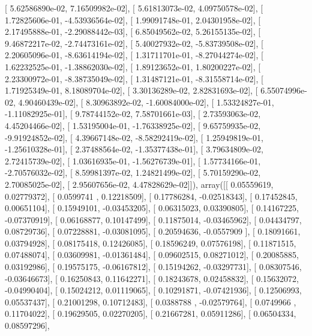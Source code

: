 \documentclass{article}
\begin{document}
       [  5.62586890e-02,   7.16509982e-02],
       [  5.61813073e-02,   4.09750578e-02],
       [  1.72825606e-01,  -4.53936564e-02],
       [  1.99091748e-01,   2.04301958e-02],
       [  2.17495888e-01,  -2.29088442e-03],
       [  6.85049562e-02,   5.26155135e-02],
       [  9.46872217e-02,  -2.74473161e-02],
       [  5.40027932e-02,  -5.83739508e-02],
       [  2.20605096e-01,  -8.63614194e-02],
       [  1.31711701e-01,  -8.27044274e-02],
       [  1.62232525e-01,  -1.38862030e-02],
       [  1.89123652e-01,   1.80200227e-02],
       [  2.23300972e-01,  -8.38735049e-02],
       [  1.31487121e-01,  -8.31558714e-02],
       [  1.71925349e-01,   8.18089704e-02],
       [  3.30136289e-02,   2.82831693e-02],
       [  6.55074996e-02,   4.90460439e-02],
       [  8.30963892e-02,  -1.60084000e-02],
       [  1.53324827e-01,  -1.11082925e-01],
       [  9.78744152e-02,   7.58701661e-03],
       [  2.73593063e-02,   4.45204466e-02],
       [  1.53195004e-01,  -1.76338925e-02],
       [  9.65759935e-02,  -9.91924852e-02],
       [  4.39667148e-02,  -8.58292419e-02],
       [  1.25949819e-01,  -1.25610328e-01],
       [  2.37488564e-02,  -1.35377438e-01],
       [  3.79634809e-02,   2.72415739e-02],
       [  1.03616935e-01,  -1.56276739e-01],
       [  1.57734166e-01,  -2.70576032e-02],
       [  8.59981397e-02,   1.24821499e-02],
       [  5.70159290e-02,   2.70085025e-02],
       [  2.95607656e-02,   4.47828629e-02]]), array([[ 0.05559619,  0.02779372],
       [ 0.0599741 ,  0.12218509],
       [ 0.17786284, -0.02518343],
       [ 0.17452845,  0.00651104],
       [ 0.15949101, -0.03453205],
       [ 0.06315023,  0.03390805],
       [ 0.14167225, -0.07370919],
       [ 0.06168877,  0.10147499],
       [ 0.11875014, -0.03465962],
       [ 0.04434797,  0.08729736],
       [ 0.07228881, -0.03081095],
       [ 0.20594636, -0.0557909 ],
       [ 0.18091661,  0.03794928],
       [ 0.08175418,  0.12426085],
       [ 0.18596249,  0.07576198],
       [ 0.11871515,  0.07488074],
       [ 0.03609981, -0.01361484],
       [ 0.09602515,  0.08271012],
       [ 0.20085885,  0.03192986],
       [ 0.19575175, -0.06167812],
       [ 0.15194262, -0.03297731],
       [ 0.08307546, -0.03646673],
       [ 0.16250843,  0.11642271],
       [ 0.18243678,  0.02458832],
       [ 0.15632072, -0.04990404],
       [ 0.15024212,  0.01119065],
       [ 0.10291871, -0.07421936],
       [ 0.12506993,  0.05537437],
       [ 0.21001298,  0.10712483],
       [ 0.0388788 , -0.02579764],
       [ 0.0749966 ,  0.11704022],
       [ 0.19629505,  0.02270205],
       [ 0.21667281,  0.05911286],
       [ 0.06504334,  0.08597296],
\end{document}
